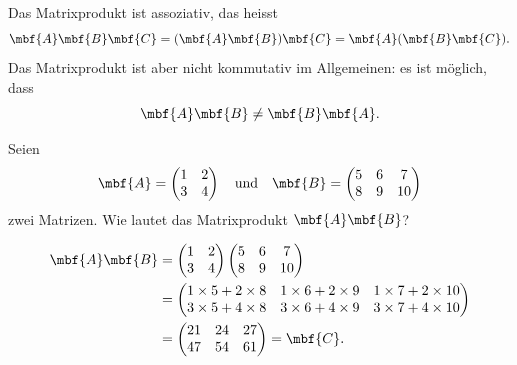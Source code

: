 Das Matrixprodukt ist assoziativ, das heisst
\begin{equation}
	\mbf{A}\mbf{B}\mbf{C} = (\mbf{A}\mbf{B})\mbf{C} = \mbf{A}(\mbf{B}\mbf{C}).
\end{equation}
Das Matrixprodukt ist aber nicht kommutativ im Allgemeinen: es ist möglich, dass
\begin{equation}
	\mbf{A}\mbf{B} \not= \mbf{B}\mbf{A}.
\end{equation}

\begin{beispiel}
	Seien 
	\begin{equation}
		\mbf{A} = \begin{pmatrix}
			1 & 2 \\ 3 & 4
		\end{pmatrix} \quad\text{und}\quad \mbf{B} = \begin{pmatrix}
			5 & 6 & 7 \\ 8 & 9 & 10
		\end{pmatrix}
	\end{equation}
	zwei Matrizen. Wie lautet das Matrixprodukt $\mbf{A}\mbf{B}$?
\end{beispiel}
\begin{lösung}
	\begin{equation}
		\begin{split}
			\mbf{A}\mbf{B} &= \begin{pmatrix}
			1 & 2 \\ 3 & 4
		\end{pmatrix}\begin{pmatrix}
			5 & 6 & 7 \\ 8 & 9 & 10
		\end{pmatrix} \\
		&= \begin{pmatrix}
			1\times 5 + 2\times 8 & 1\times 6 + 2\times 9 & 1\times 7 + 2\times 10  \\
			3\times 5 + 4\times 8 & 3\times 6 + 4\times 9 & 3\times 7 + 4\times 10 
		\end{pmatrix} \\
		&= \begin{pmatrix}
			21 & 24 & 27 \\
			47 & 54 & 61
		\end{pmatrix} = \mbf{C}.
		\end{split}
	\end{equation}
\end{lösung}

